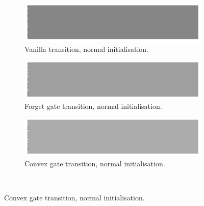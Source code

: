 \begin{figure}
\centering
\begin{subfigure}[t]{0.3\textwidth}
\includegraphics[width=\textwidth]{appendix/init/vanillanormal}
\caption{Vanilla transition, normal initialisation.}
\end{subfigure}\hfill
\begin{subfigure}[t]{0.3\textwidth}
\includegraphics[width=\textwidth]{appendix/init/lstmnormal}
\caption{Forget gate transition, normal initialisation.}
\end{subfigure}\hfill
\begin{subfigure}[t]{0.3\textwidth}
\includegraphics[width=\textwidth]{appendix/init/grunormal}
\caption{Convex gate transition, normal initialisation.}
\end{subfigure}\\


\end{figure}
